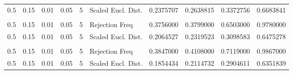 \begin{table}
{{\begin{tabular}{rrrrrlrrrr}
\hspace{1em}\hspace{1em}0.5 & 0.15 & 0.01 & 0.05 & 5 & Scaled Eucl. Dist. & 0.2375707 & 0.2638815 & 0.3372756 & 0.6683841\\
\addlinespace[0.3em]
\multicolumn{10}{l}{\textbf{n = 400}}\\
\hspace{1em}\hspace{1em}0.5 & 0.15 & 0.01 & 0.05 & 5 & Rejection Freq & 0.3756000 & 0.3799000 & 0.6503000 & 0.9780000\\
\hspace{1em}\hspace{1em}0.5 & 0.15 & 0.01 & 0.05 & 5 & Scaled Eucl. Dist. & 0.2064527 & 0.2319523 & 0.3098583 & 0.6475278\\
\addlinespace[0.3em]
\multicolumn{10}{l}{\textbf{n = 500}}\\
\hspace{1em}\hspace{1em}0.5 & 0.15 & 0.01 & 0.05 & 5 & Rejection Freq & 0.3847000 & 0.4108000 & 0.7119000 & 0.9867000\\
\hspace{1em}\hspace{1em}0.5 & 0.15 & 0.01 & 0.05 & 5 & Scaled Eucl. Dist. & 0.1854434 & 0.2114732 & 0.2904611 & 0.6351839\\
\bottomrule
\end{tabular}
}}
 \end{table}
